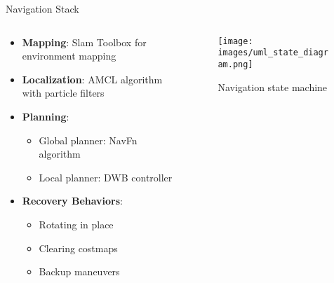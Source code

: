 \documentclass[aspectratio=169]{beamer}
\begin{document}
\begin{comment}
\section{Testing anim}

\begin{frame}{Animated Demonstration}
	\begin{figure}
		\centering
		\animategraphics[
			autoplay,        %
			loop,            %
			width=0.3\textwidth,
		]{10}              %
		{animation_frames/frame-}  %
		{000}                %
		{043}               %
		\caption{Rotating Water Demonstration}
	\end{figure}
\end{frame}
\end{comment}

\begin{frame}{Navigation Stack}
	\begin{columns}
		\begin{column}{0.6\textwidth}
			\begin{itemize}
				\item \textbf{Mapping}: Slam Toolbox for environment mapping
				\item \textbf{Localization}: AMCL algorithm with particle filters
				\item \textbf{Planning}:
				      \begin{itemize}
					      \item Global planner: NavFn algorithm
					      \item Local planner: DWB controller
				      \end{itemize}
				\item \textbf{Recovery Behaviors}:
				      \begin{itemize}
					      \item Rotating in place
					      \item Clearing costmaps
					      \item Backup maneuvers
				      \end{itemize}
			\end{itemize}
		\end{column}
		\begin{column}{0.4\textwidth}
			\begin{figure}
				\texttt{[image: images/uml\_state\_diagram.png]}
				\caption{Navigation state machine}
			\end{figure}
		\end{column}
	\end{columns}
\end{frame}
\end{document}
